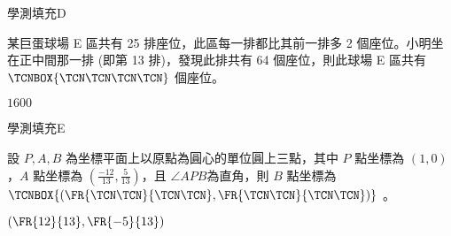     \begin{QUESTION}
        \begin{ExamInfo}{96}{學測}{填充}{D}
        \end{ExamInfo}
        \begin{ExamAnsRateInfo}{75}{92}{82}{51}
        \end{ExamAnsRateInfo}
        \begin{QBODY}
            某巨蛋球場 E 區共有 25 排座位，此區每一排都比其前一排多 2 個座位。小明坐在正中間那一排 (即第 13 排)，發現此排共有 64 個座位，則此球場 E 區共有$\TCNBOX{\TCN\TCN\TCN\TCN}$ 個座位。
        \end{QBODY}
        \begin{QFROMS}
        \end{QFROMS}
        \begin{QTAGS}\end{QTAGS}
        \begin{QANS}
            $1600$
        \end{QANS}
        \begin{QSOLLIST}
        \end{QSOLLIST}
        \begin{QEMPTYSPACE}
        \end{QEMPTYSPACE}
    \end{QUESTION}
    \begin{QUESTION}
        \begin{ExamInfo}{96}{學測}{填充}{E}
        \end{ExamInfo}
        \begin{ExamAnsRateInfo}{29}{66}{18}{3}
        \end{ExamAnsRateInfo}
        \begin{QBODY}
            設 $P, A, B$ 為坐標平面上以原點為圓心的單位圓上三點，其中 $P$ 點坐標為 $(1, 0)$，$A$ 點坐標為 $(\frac{-12}{13},\frac{5}{13})$，且 $\angle APB$為直角，則 $B$ 點坐標為 $\TCNBOX{(\FR{\TCN\TCN}{\TCN\TCN},\FR{\TCN\TCN}{\TCN\TCN})}$ 。
        \end{QBODY}
        \begin{QFROMS}
        \end{QFROMS}
        \begin{QTAGS}\end{QTAGS}
        \begin{QANS}
            $(\FR{12}{13},\FR{-5}{13})$
        \end{QANS}
        \begin{QSOLLIST}
        \end{QSOLLIST}
        \begin{QEMPTYSPACE}
        \end{QEMPTYSPACE}
    \end{QUESTION}
